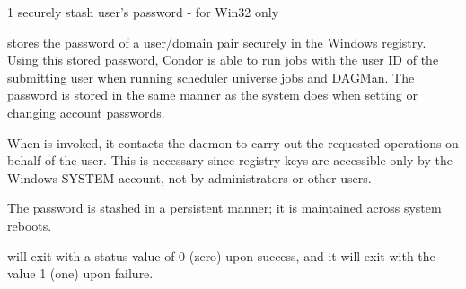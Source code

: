 \begin{ManPage}{\label{man-condor-store-cred}}{1}
{securely stash user's password - for Win32 only}
\Synopsis {}


\Description 

 stores the password of a user/domain pair
securely in the Windows registry.
Using this stored password,
Condor is able to run jobs with the user ID of the submitting user
when running scheduler universe jobs and DAGMan.
The password is stored
in the same manner as 
the system does when
setting or changing account passwords.

When  is invoked,
it contacts the  daemon to 
carry out the requested operations on behalf of the user.
This is necessary since registry keys
are accessible only by the Windows SYSTEM account, not by administrators
or other users. 

The password is stashed in a persistent manner; it is maintained
across system reboots.

\begin{Options}



\end{Options}

\ExitStatus

 will exit with a status value of 0 (zero) upon success,
and it will exit with the value 1 (one) upon failure.

\end{ManPage}
